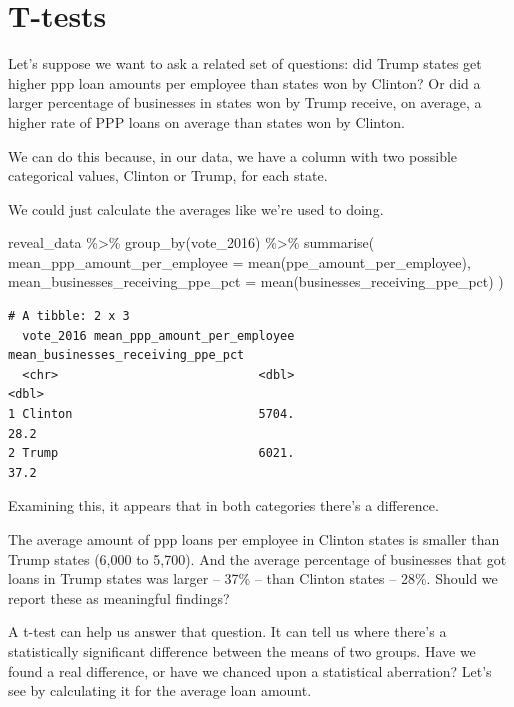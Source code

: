 \documentclass[
  letterpaper,
  DIV=11,
  numbers=noendperiod]{scrreprt}
\newenvironment{Shaded}{\begin{snugshade}}{\end{snugshade}}
\newcommand{\AttributeTok}[1]{\textcolor[rgb]{0.40,0.45,0.13}{#1}}
\newcommand{\FunctionTok}[1]{\textcolor[rgb]{0.28,0.35,0.67}{#1}}
\newcommand{\NormalTok}[1]{\textcolor[rgb]{0.00,0.23,0.31}{#1}}
\newcommand{\SpecialCharTok}[1]{\textcolor[rgb]{0.37,0.37,0.37}{#1}}
\begin{document}

\hypertarget{t-tests}{%
\chapter{T-tests}\label{t-tests}}

Let's suppose we want to ask a related set of questions: did Trump
states get higher ppp loan amounts per employee than states won by
Clinton? Or did a larger percentage of businesses in states won by Trump
receive, on average, a higher rate of PPP loans on average than states
won by Clinton.

We can do this because, in our data, we have a column with two possible
categorical values, Clinton or Trump, for each state.

We could just calculate the averages like we're used to doing.

\begin{Shaded}
\begin{Highlighting}[]
\NormalTok{reveal\_data }\SpecialCharTok{\%\textgreater{}\%}
  \FunctionTok{group\_by}\NormalTok{(vote\_2016) }\SpecialCharTok{\%\textgreater{}\%}
  \FunctionTok{summarise}\NormalTok{(}
    \AttributeTok{mean\_ppp\_amount\_per\_employee =} \FunctionTok{mean}\NormalTok{(ppe\_amount\_per\_employee),}
    \AttributeTok{mean\_businesses\_receiving\_ppe\_pct =} \FunctionTok{mean}\NormalTok{(businesses\_receiving\_ppe\_pct)}
\NormalTok{  )}
\end{Highlighting}
\end{Shaded}

\begin{verbatim}
# A tibble: 2 x 3
  vote_2016 mean_ppp_amount_per_employee mean_businesses_receiving_ppe_pct
  <chr>                            <dbl>                             <dbl>
1 Clinton                          5704.                              28.2
2 Trump                            6021.                              37.2
\end{verbatim}

Examining this, it appears that in both categories there's a difference.

The average amount of ppp loans per employee in Clinton states is
smaller than Trump states (6,000 to 5,700). And the average percentage
of businesses that got loans in Trump states was larger -- 37\% -- than
Clinton states -- 28\%. Should we report these as meaningful findings?

A t-test can help us answer that question. It can tell us where there's
a statistically significant difference between the means of two groups.
Have we found a real difference, or have we chanced upon a statistical
aberration? Let's see by calculating it for the average loan amount.
\end{document}
